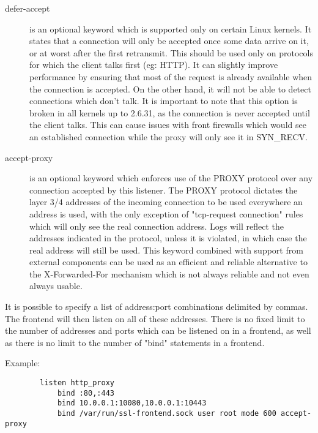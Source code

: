 \begin{description}
  \item[defer-accept]  is an optional keyword which is supported only on certain
                  Linux kernels. It states that a connection will only be
                  accepted once some data arrive on it, or at worst after the
                  first retransmit. This should be used only on protocols for
                  which the client talks first (eg: HTTP). It can slightly
                  improve performance by ensuring that most of the request is
                  already available when the connection is accepted. On the
                  other hand, it will not be able to detect connections which
                  don't talk. It is important to note that this option is
                  broken in all kernels up to 2.6.31, as the connection is
                  never accepted until the client talks. This can cause issues
                  with front firewalls which would see an established
                  connection while the proxy will only see it in SYN\_RECV.

  \item[accept-proxy]  is an optional keyword which enforces use of the PROXY
                  protocol over any connection accepted by this listener. The
                  PROXY protocol dictates the layer 3/4 addresses of the
                  incoming connection to be used everywhere an address is used,
                  with the only exception of "tcp-request connection" rules
                  which will only see the real connection address. Logs will
                  reflect the addresses indicated in the protocol, unless it is
                  violated, in which case the real address will still be used.
                  This keyword combined with support from external components
                  can be used as an efficient and reliable alternative to the
                  X-Forwarded-For mechanism which is not always reliable and
                  not even always usable.
  \end{description}

  It is possible to specify a list of address:port combinations delimited by
  commas. The frontend will then listen on all of these addresses. There is no
  fixed limit to the number of addresses and ports which can be listened on in
  a frontend, as well as there is no limit to the number of "bind" statements
  in a frontend.

  Example:
  \begin{verbatim}
        listen http_proxy
            bind :80,:443
            bind 10.0.0.1:10080,10.0.0.1:10443
            bind /var/run/ssl-frontend.sock user root mode 600 accept-proxy
  \end{verbatim}

